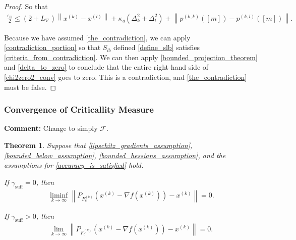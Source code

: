 \documentclass{article}
\newenvironment{comment}
  {\par\medskip
   \color{red}%
   \begin{framed}
   \textbf{Comment: }\ignorespaces}
 {\end{framed}
  \medskip}
\newtheorem{theorem}{Theorem}[section]
\theoremstyle{case}
\numberwithin{theorem}{subsection}
\newcommand{\dk}{\Delta_k}
\newcommand{\dl}{\Delta_l}
\newcommand{\feasible}{{\mathcal F}}
\newcommand{\gammabi}{\gamma_{\textrm{suff}}}
\newcommand{\gradf}{\nabla f}
\newcommand{\lipgrad}{{L_{\nabla}}}
\newcommand{\xk}{x^{(k)}}
\newcommand{\xl}{{x^{(l)}}}
\newcommand{\projkl}{{p^{(k,l)}}}
\newcommand{\projkk}{{p^{(k,k)}}}
\newcommand{\truefeasiblek}{{F_c^{(k)}}}
\begin{document}
\begin{proof}
So that
\begin{align}
\frac{\epsilon_{lb}} 2 \le \left(2 + \lipgrad\right) \left\|\xk - \xl\right\| 
+ \kappa_g \left(\dk^2 + \dl^2\right)
+ \left\|\projkk\left([m]\right) - \projkl\left([m]\right)\right\|
\label{chi2zero2_conv}.
\end{align}

Because we have assumed \cref{the_contradiction}, we can apply \cref{contradiction_portion} so that 
$S_{lb}$ defined \cref{define_slb} satisfies \cref{criteria_from_contradiction}.
We can then apply \cref{bounded_projection_theorem} and \cref{delta_to_zero} to conclude that the entire right hand side of \cref{chi2zero2_conv} goes to zero.
This is a contradiction, and \cref{the_contradiction} must be false.
\end{proof}

\subsubsection{Convergence of Criticallity Measure}
\label{limit_of_true_criticallity}

\begin{comment}
Change to simply $\feasible$.
\end{comment}

\begin{theorem}
\label{the_convergence_theorem}
Suppose that \cref{lipschitz_gradients_assumption}, \cref{bounded_below_assumption}, \cref{bounded_hessians_assumption}, and 
the assumptions for \cref{accuracy_is_satisfied} hold.

If $\gammabi = 0$, then
\begin{align}
\liminf_{k\to\infty} \left\|P_{\truefeasiblek}\left(\xk - \gradf(\xk)\right) - \xk \right\| = 0.
\end{align}

If $\gammabi > 0$, then
\begin{align}
\lim_{k\to\infty} \left\|P_{\truefeasiblek}\left(\xk - \gradf(\xk)\right) - \xk \right\| = 0.
\end{align}

\end{theorem}
\end{document}
